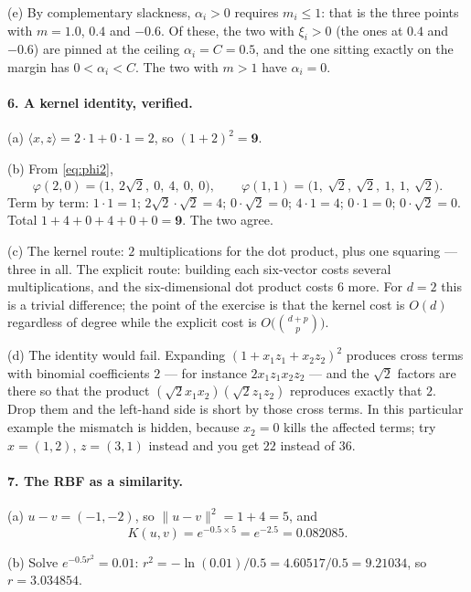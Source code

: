 \documentclass[11pt]{article}
\begin{document}
(e) By complementary slackness, $\alpha_i > 0$ requires $m_i \le 1$: that is
the three points with $m = 1.0$, $0.4$ and $-0.6$. Of these, the two with
$\xi_i > 0$ (the ones at $0.4$ and $-0.6$) are pinned at the ceiling
$\alpha_i = C = 0.5$, and the one sitting exactly on the margin has
$0 < \alpha_i < C$. The two with $m > 1$ have $\alpha_i = 0$.

\paragraph{6. A kernel identity, verified.}
(a) $\langle x, z\rangle = 2\cdot1 + 0\cdot1 = 2$, so
$(1 + 2)^2 = \mathbf{9}$.

(b) From \eqref{eq:phi2},
\[
  \varphi(2,0) = \bigl(1,\ 2\sqrt2,\ 0,\ 4,\ 0,\ 0\bigr),
  \qquad
  \varphi(1,1) = \bigl(1,\ \sqrt2,\ \sqrt2,\ 1,\ 1,\ \sqrt2\bigr).
\]
Term by term:
$1\cdot1 = 1$;
$2\sqrt2\cdot\sqrt2 = 4$;
$0\cdot\sqrt2 = 0$;
$4\cdot1 = 4$;
$0\cdot1 = 0$;
$0\cdot\sqrt2 = 0$. Total $1 + 4 + 0 + 4 + 0 + 0 = \mathbf{9}$. The two agree.

(c) The kernel route: $2$ multiplications for the dot product, plus one
squaring --- three in all. The explicit route: building each six-vector costs
several multiplications, and the six-dimensional dot product costs $6$ more.
For $d = 2$ this is a trivial difference; the point of the exercise is that the
kernel cost is $O(d)$ regardless of degree while the explicit cost is
$O\bigl(\binom{d+p}{p}\bigr)$.

(d) The identity would fail. Expanding $(1 + x_1z_1 + x_2z_2)^2$ produces cross
terms with binomial coefficients $2$ --- for instance $2x_1z_1x_2z_2$ --- and
the $\sqrt2$ factors are there so that the product
$(\sqrt2 x_1x_2)(\sqrt2 z_1z_2)$ reproduces exactly that $2$. Drop them and the
left-hand side is short by those cross terms. In this particular example the
mismatch is hidden, because $x_2 = 0$ kills the affected terms; try
$x = (1,2)$, $z = (3,1)$ instead and you get $22$ instead of $36$.

\paragraph{7. The RBF as a similarity.}
(a) $u - v = (-1, -2)$, so $\|u - v\|^2 = 1 + 4 = 5$, and
\[
  K(u,v) = e^{-0.5 \times 5} = e^{-2.5} = \mathbf{0.082085} .
\]

(b) Solve $e^{-0.5 r^2} = 0.01$: $r^2 = -\ln(0.01)/0.5 = 4.60517/0.5 = 9.21034$,
so $r = \mathbf{3.034854}$.
\end{document}

